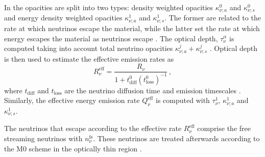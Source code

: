 %
%
In \wisky{} the opacities are split into two types: density weighted 
opacities $\kappa_{\nu;a}^0$ and $\kappa_{\nu;s}^0$ and energy density 
weighted opacities $\kappa_{\nu;a}^1$ and $\kappa_{\nu;s}^1$. 
The former are related to the rate at which neutrinos escape the material, 
while the latter set the rate at which energy escapes the material 
as neutrinos escape \citep{Ruffert:1995fs}.
%
The optical depth, $\tau_{\nu}^{\alpha}$ is computed taking into account 
total neutrino opacities $\kappa_{\nu;a}^j + \kappa_{\nu;s}^j$ \citep{Neilsen:2014hha}.
%
Optical depth is then used to estimate the effective emission rates \citep{Ruffert:1995fs} as 
%
\begin{equation}
R_{\nu}^{\text{eff}} = \frac{R_{\nu}}{1 + t_{\text{diff}}^0(t^0_{\text{loss}})^{-1}}\, ,
\label{eq:method:whisky:Rnueff}
\end{equation}
%
where $t_{\text{diff}}$ and $t_{\text{loss}}$ are the neutrino diffusion time and emission timescales 
%
%
%
%
\citep{Radice:2018pdn}.
%
%
Similarly, the effective energy emission rate $Q_{\nu}^{\text{eff}}$ 
is computed with $\tau_{\nu}^1$, $\kappa_{\nu;a}^1$ and $\kappa_{\nu;s}^1$.

The neutrinos that escape according to the effective rate $R_{\nu}^{\text{eff}}$ 
comprise the free streaming neutrinos with $n_{\nu}^{\text{fs}}$. 
%
These neutrinos are treated afterwards according to the 
M0 scheme in the optically thin region \citep{Radice:2016dwd}.

